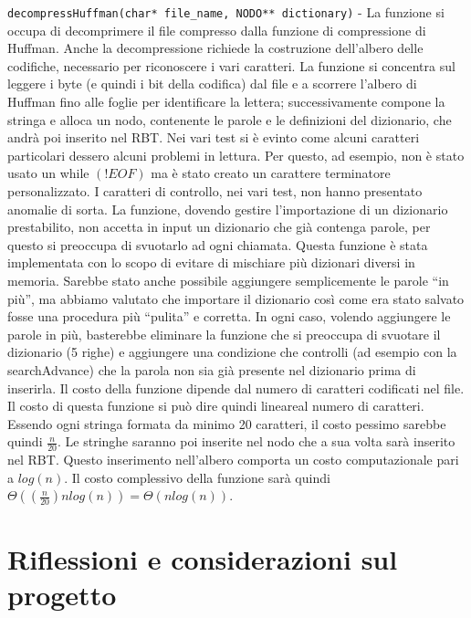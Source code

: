 \documentclass[paper=a4, fontsize=11pt,twoside]{scrartcl}   %
\begin{document}
				\texttt{decompressHuffman(char* file\_name, NODO** dictionary)} - La funzione si occupa di decomprimere il file compresso dalla funzione di compressione di Huffman. Anche la decompressione richiede la costruzione dell’albero delle codifiche, necessario per riconoscere i vari caratteri. La funzione si concentra sul leggere i byte (e quindi i bit della codifica) dal file e a scorrere l’albero di Huffman fino alle foglie per identificare la lettera; successivamente compone la stringa e alloca un nodo, contenente le parole e le definizioni del dizionario, che andrà poi inserito nel RBT. Nei vari test si è evinto come alcuni caratteri particolari dessero alcuni problemi in lettura. Per questo, ad esempio, non è stato usato un while $(!EOF)$ ma è stato creato un carattere terminatore personalizzato. I caratteri di controllo, nei vari test, non hanno presentato anomalie di sorta. La funzione, dovendo gestire l’importazione di un dizionario prestabilito, non accetta in input un dizionario che già contenga parole, per questo si preoccupa di svuotarlo ad ogni chiamata. Questa funzione è stata implementata con lo scopo di evitare di mischiare più dizionari diversi in memoria. Sarebbe stato anche possibile aggiungere semplicemente le parole “in più”, ma abbiamo valutato che importare il dizionario così come era stato salvato fosse una procedura più “pulita” e corretta. In ogni caso, volendo aggiungere le parole in più, basterebbe eliminare la funzione che si preoccupa di svuotare il dizionario (5 righe) e aggiungere una condizione che controlli (ad esempio con la searchAdvance) che la parola non sia già presente nel dizionario prima di inserirla. Il costo della funzione dipende dal numero di caratteri codificati nel file. Il costo di questa funzione si può dire quindi lineareal numero di caratteri. Essendo ogni stringa formata da minimo 20 caratteri, il costo pessimo sarebbe quindi $\frac{n}{20}$. Le stringhe saranno poi inserite nel nodo che a sua volta sarà inserito nel RBT. Questo inserimento nell'albero comporta un costo computazionale pari a $log(n)$. Il costo complessivo della funzione sarà quindi $\Theta((\frac{n}{20})nlog(n)) = \Theta(nlog(n))$. 
			\pagebreak
		\section{Riflessioni e considerazioni sul progetto}
\end{document}
